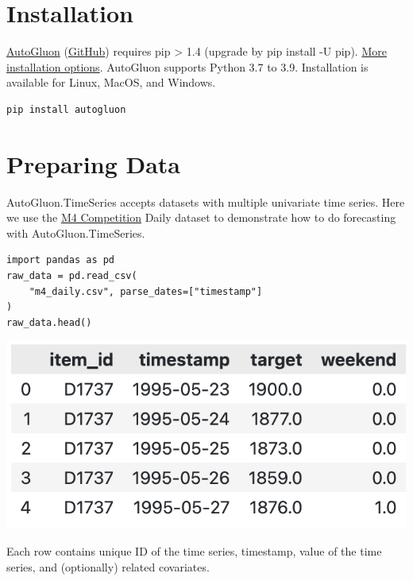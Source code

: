 \section*{Installation}
\href{https://auto.gluon.ai/stable/index.html}{AutoGluon} (\href{https://github.com/awslabs/autogluon/}{GitHub}) requires pip > 1.4 (upgrade by pip install -U pip). \href{https://auto.gluon.ai/stable/index.html#installation}{More installation options}. AutoGluon supports Python 3.7 to 3.9. Installation is available for Linux, MacOS, and Windows.

\begin{verbatim}
pip install autogluon 
\end{verbatim}


\section*{Preparing Data}

AutoGluon.TimeSeries accepts datasets with multiple univariate time series. Here we use the \href{https://www.sciencedirect.com/science/article/pii/S0169207019301128}{M4 Competition} Daily dataset to demonstrate how to do forecasting with AutoGluon.TimeSeries.

\begin{verbatim}
import pandas as pd
raw_data = pd.read_csv(
    "m4_daily.csv", parse_dates=["timestamp"]
)
raw_data.head()
\end{verbatim}

\begin{center}
\includegraphics[width=0.6\linewidth]{timeseries/images/raw_data.png}
\end{center}

\medskip

Each row contains unique ID of the time series, timestamp, value of the time series, and (optionally) related covariates.

